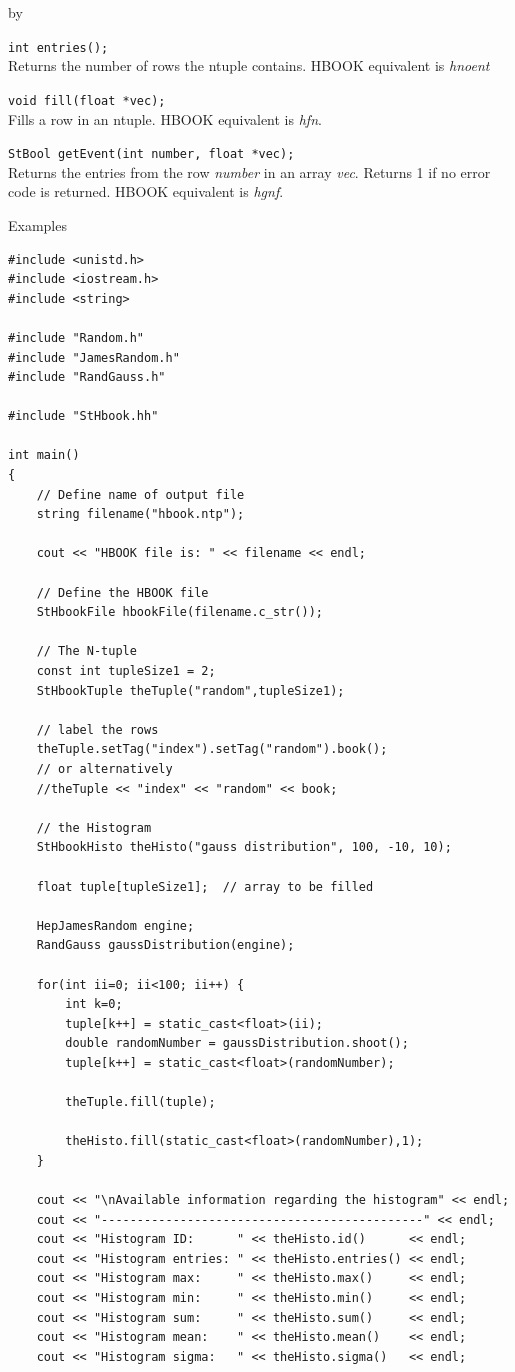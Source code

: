 \documentclass[twoside]{article}
\newcommand{\entrylabel}[1]{\mbox{\textbf{{#1}}}\hfil}%
\newenvironment{entry}
{\begin{list}{}%
    {\renewcommand{\makelabel}{\entrylabel}%
     \setlength{\labelwidth}{90pt}%
     \setlength{\leftmargin}{\labelwidth}
     \advance\leftmargin by \labelsep%
      }%
    }%
  {\end{list}}
\newcommand{\Entrylabel}[1]%
{\raisebox{0pt}[1ex][0pt]{\makebox[\labelwidth][l]%
    {\parbox[t]{\labelwidth}{\hspace{0pt}\textbf{{#1}}}}}}
\newenvironment{Entry}%
{\renewcommand{\entrylabel}{\Entrylabel}\begin{entry}}%
  {\end{entry}}
\begin{document}
\begin{description}
\begin{Entry}
  \verb+int entries();+\\
  Returns the number of rows the ntuple contains.  HBOOK equivalent
  is {\em hnoent}
  
  \verb+void fill(float *vec);+\\
  Fills a row in an ntuple.  HBOOK equivalent is {\em hfn}.
  
  \verb+StBool getEvent(int number, float *vec);+\\
  Returns the entries from the row {\em number} in an array {\em vec}.
  Returns 1 if no error code is returned.
  HBOOK equivalent is {\em hgnf}.

\item[Examples]
{\footnotesize
\begin{verbatim}
#include <unistd.h>
#include <iostream.h>
#include <string>

#include "Random.h"
#include "JamesRandom.h"
#include "RandGauss.h"

#include "StHbook.hh"

int main()
{
    // Define name of output file
    string filename("hbook.ntp");

    cout << "HBOOK file is: " << filename << endl;

    // Define the HBOOK file
    StHbookFile hbookFile(filename.c_str());

    // The N-tuple
    const int tupleSize1 = 2;
    StHbookTuple theTuple("random",tupleSize1);

    // label the rows
    theTuple.setTag("index").setTag("random").book();
    // or alternatively
    //theTuple << "index" << "random" << book;

    // the Histogram
    StHbookHisto theHisto("gauss distribution", 100, -10, 10);

    float tuple[tupleSize1];  // array to be filled
    
    HepJamesRandom engine;
    RandGauss gaussDistribution(engine);
    
    for(int ii=0; ii<100; ii++) {
        int k=0;
        tuple[k++] = static_cast<float>(ii);
        double randomNumber = gaussDistribution.shoot();
        tuple[k++] = static_cast<float>(randomNumber);
        
        theTuple.fill(tuple);

        theHisto.fill(static_cast<float>(randomNumber),1);
    }

    cout << "\nAvailable information regarding the histogram" << endl;
    cout << "---------------------------------------------" << endl;
    cout << "Histogram ID:      " << theHisto.id()      << endl;
    cout << "Histogram entries: " << theHisto.entries() << endl;
    cout << "Histogram max:     " << theHisto.max()     << endl;
    cout << "Histogram min:     " << theHisto.min()     << endl;
    cout << "Histogram sum:     " << theHisto.sum()     << endl;
    cout << "Histogram mean:    " << theHisto.mean()    << endl;
    cout << "Histogram sigma:   " << theHisto.sigma()   << endl;


\end{verbatim}}
\end{Entry}
\end{description}
\end{document}
